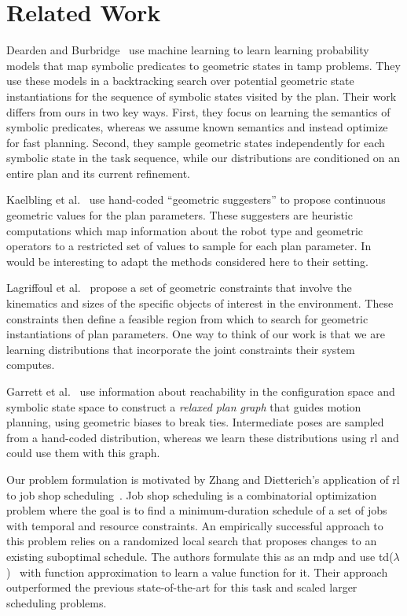 \section{Related Work}
Dearden and Burbridge~\cite{deardenplanningtamp} use machine learning
to learn learning probability models that map symbolic predicates to
geometric states in {\sc tamp} problems. They use these models in a
backtracking search over potential geometric state instantiations for
the sequence of symbolic states visited by the plan.  Their work
differs from ours in two key ways. First, they focus on learning the
semantics of symbolic predicates, whereas we assume known semantics
and instead optimize for fast planning. Second, they sample geometric
states independently for each symbolic state in the task sequence,
while our distributions are conditioned on an entire plan and its
current refinement.

Kaelbling et al.~\cite{kaelbling2011hierarchical} use hand-coded
``geometric suggesters'' to propose continuous geometric values for
the plan parameters. These suggesters are heuristic computations which
map information about the robot type and geometric operators to a
restricted set of values to sample for each plan parameter. In would
be interesting to adapt the methods considered here to their setting.

Lagriffoul et al.~\cite{lagriffoul2014orientation} propose a set of
geometric constraints that involve the kinematics and sizes of the
specific objects of interest in the environment. These constraints
then define a feasible region from which to search for geometric
instantiations of plan parameters. One way to think of our work is
that we are learning distributions that incorporate the joint
constraints their system computes. 

Garrett et al.~\cite{GarrettWAFR14} use information about reachability
in the configuration space and symbolic state space to construct a
\emph{relaxed plan graph} that guides motion planning, using geometric
biases to break ties. Intermediate poses are sampled from a hand-coded
distribution, whereas we learn these distributions using {\sc rl} and
could use them with this graph.

Our problem formulation is motivated by Zhang and Dietterich's
application of {\sc rl} to job shop
scheduling~\cite{JobShopSched}. Job shop scheduling is a combinatorial
optimization problem where the goal is to find a minimum-duration
schedule of a set of jobs with temporal and resource constraints. An
empirically successful approach to this problem relies on a randomized
local search that proposes changes to an existing suboptimal
schedule. The authors formulate this as an {\sc mdp} and use {\sc
  td}($\lambda$)~\cite{suttonbarto} with function approximation to
learn a value function for it. Their approach outperformed the
previous state-of-the-art for this task and scaled larger scheduling
problems.

